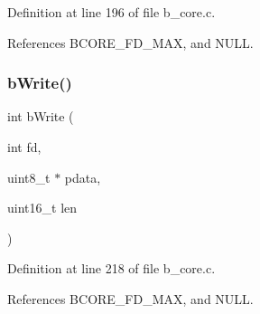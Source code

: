 Definition at line 196 of file b\+\_\+core.\+c.



References B\+C\+O\+R\+E\+\_\+\+F\+D\+\_\+\+M\+AX, and N\+U\+LL.

\mbox{\label{group___c_o_r_e___exported___functions_ga078b200cdc68be6d562cc1ad323d9381}} 
\subsubsection{\texorpdfstring{b\+Write()}{bWrite()}}
{\footnotesize\ttfamily int b\+Write (\begin{DoxyParamCaption}\item[{int}]{fd,  }\item[{uint8\+\_\+t $\ast$}]{pdata,  }\item[{uint16\+\_\+t}]{len }\end{DoxyParamCaption})}



Definition at line 218 of file b\+\_\+core.\+c.



References B\+C\+O\+R\+E\+\_\+\+F\+D\+\_\+\+M\+AX, and N\+U\+LL.


